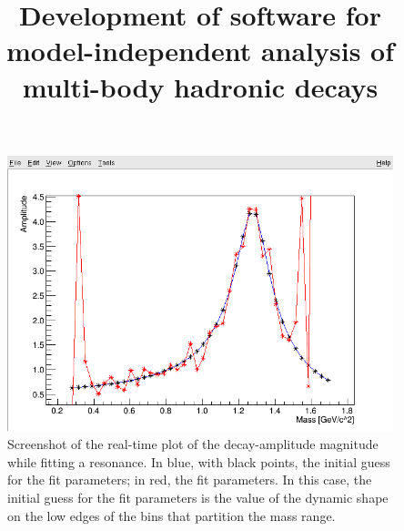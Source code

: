 \documentclass[
    a4paper,
    titlepage,
    BCOR5mm,
    numbers=noenddot,
    cleardoublepage=empty,
    tablecaptionabove
    fontsize=10pt,
    open=right,
    twoside,
    english,
	final
]{scrbook}
\title{Development of software for model-independent analysis of multi-body hadronic decays}
\subtitle{}
\author{
  
}
\date{}
\begin{document}
%
\frontmatter
{}
{}
	\maketitle
	\thispagestyle{empty}

	\cleardoublepage
{}
{}
	

	\cleardoublepage
{}
{}
	

	\cleardoublepage
{}
{}
	

	\cleardoublepage
{}
{}
	\tableofcontents

    \cleardoublepage
{}
{}
	\listoffigures


%
\mainmatter

    
    
    
    

    \begin{figure}
        \centering
        \includegraphics[width=.9\textwidth]{fig/f2_real_time_fit.png}

        \caption{Screenshot of the real-time plot of the decay-amplitude magnitude while fitting a \Pfii{} resonance.
                 In blue, with black points, the initial guess for the fit parameters; in red, the fit parameters.
                 In this case, the initial guess for the fit parameters is the value of the \Pfii{} dynamic shape on the low edges of the bins that partition the mass range.}
        \label{fig:rt_par_fit}
    \end{figure}
\end{document}
